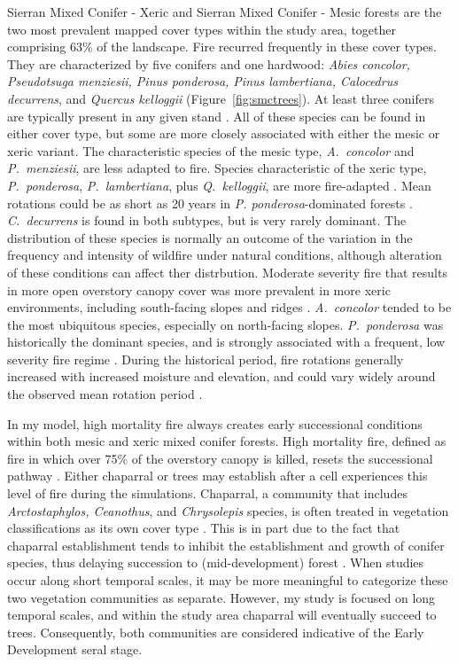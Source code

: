 Sierran Mixed Conifer - Xeric and Sierran Mixed Conifer - Mesic forests are the two most prevalent mapped cover types within the study area, together comprising 63\% of the landscape. Fire recurred frequently in these cover types. They are characterized by five conifers and one hardwood: \emph{Abies concolor, Pseudotsuga menziesii, Pinus ponderosa, Pinus lambertiana, Calocedrus decurrens}, and \emph{Quercus kelloggii} (Figure~\ref{fig:smctrees}). At least three conifers are typically present in any given stand \citep{Landfire2007}. All of these species can be found in either cover type, but some are more closely associated with either the mesic or xeric variant. The characteristic species of the mesic type, \emph{A.~concolor} and \emph{P.~menziesii}, are less adapted to fire. Species characteristic of the xeric type, \emph{P.~ponderosa}, \emph{P.~lambertiana}, plus \emph{Q.~kelloggii}, are more fire-adapted \citep{Landfire2007}. Mean rotations could be as short as 20 years in \emph{P. ponderosa}-dominated forests \citep{Mallek2013}. \emph{C.~decurrens} is found in both subtypes, but is very rarely dominant. The distribution of these species is normally an outcome of the variation in the frequency and intensity of wildfire under natural conditions, although alteration of these conditions can affect ther distrbution. Moderate severity fire that results in more open overstory canopy cover was more prevalent in more xeric environments, including south-facing slopes and ridges \citep{Mallek2013,Safford2014,SNEP1996a,SNEP1996}. \emph{A.~concolor} tended to be the most ubiquitous species, especially on north-facing slopes. \emph{P.~ponderosa} was historically the dominant species, and is strongly associated with a frequent, low severity fire regime \citep{WHR1988,Landfire2007}. During the historical period, fire rotations generally increased with increased moisture and elevation, and could vary widely around the observed mean rotation period \citep{Mallek2013}. 


In my model, high mortality fire always creates early successional conditions within both mesic and xeric mixed conifer forests. High mortality fire, defined as fire in which over 75\% of the overstory canopy is killed, resets the successional pathway \citep{Agee1993}. Either chaparral or trees may establish after a cell experiences this level of fire during the simulations. Chaparral, a community that includes \emph{Arctostaphylos, Ceanothus}, and \emph{Chrysolepis} species, is often treated in vegetation classifications as its own cover type \citep{USDAForestService2008,VandeWater2011}. This is in part due to the fact that chaparral establishment tends to inhibit the establishment and growth of conifer species, thus delaying succession to (mid-development) forest \citep{Landfire2007}. When studies occur along short temporal scales, it may be more meaningful to categorize these two vegetation communities as separate. However, my study is focused on long temporal scales, and within the study area chaparral will eventually succeed to trees. Consequently, both communities are considered indicative of the Early Development seral stage.

